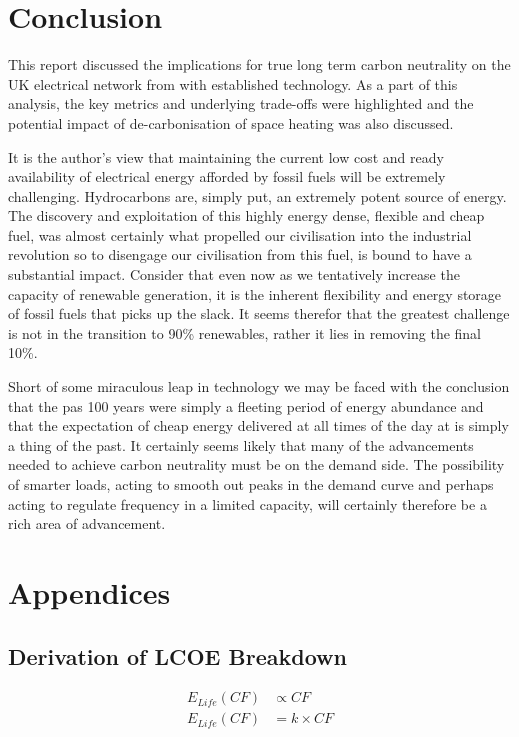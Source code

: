 \documentclass[11pt]{article}
\numberwithin{equation}{section}
\begin{document}
\section{Conclusion}
\label{sec:org0548bcd}
This report discussed the implications for true long term carbon neutrality on the UK electrical network from with established technology. As a part of this analysis, the key metrics and underlying trade-offs were highlighted and the potential impact of de-carbonisation of space heating was also discussed.

It is the author's view that maintaining the current low cost and ready availability of electrical energy afforded by fossil fuels will be extremely challenging. Hydrocarbons are, simply put, an extremely potent source of energy. The discovery and exploitation of this highly energy dense, flexible and cheap fuel, was almost certainly what propelled our civilisation into the industrial revolution so to disengage our civilisation from this fuel, is bound to have a substantial impact. Consider that even now as we tentatively increase the capacity of renewable generation, it is the inherent flexibility and energy storage of fossil fuels that picks up the slack. It seems therefor that the greatest challenge is not in the transition to 90\% renewables, rather it lies in removing the final 10\%.

Short of some miraculous leap in technology we may be faced with the conclusion that the pas 100 years were simply a fleeting period of energy abundance and that the expectation of cheap energy delivered at all times of the day at is simply a thing of the past. It certainly seems likely that many of the advancements needed to achieve carbon neutrality must be on the demand side. The possibility of smarter loads, acting to smooth out peaks in the demand curve and perhaps acting to regulate frequency in a limited capacity, will certainly therefore be a rich area of advancement.

\section{Appendices}
\label{sec:org082af94}
\subsection{Derivation of LCOE Breakdown \label{secAppDerivationOfLCOEBreakdown}}
\label{sec:org31bf6a9}
\begin{align}
\label{eqELifetime}
E_{Life}(CF) &\propto CF\\
E_{Life}(CF) &= k\times CF
\end{align}
\end{document}
